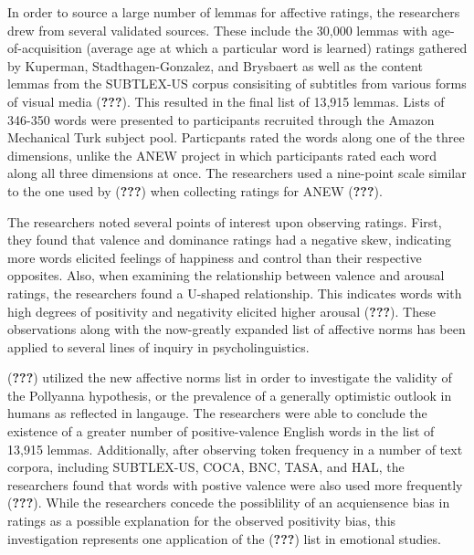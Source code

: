 \documentclass[,man]{apa6}
\theoremstyle{definition}
\theoremstyle{definition}
\theoremstyle{definition}
\theoremstyle{remark}
\begin{document}
In order to source a large number of lemmas for affective ratings, the
researchers drew from several validated sources. These include the
30,000 lemmas with age-of-acquisition (average age at which a particular
word is learned) ratings gathered by Kuperman, Stadthagen-Gonzalez, and
Brysbaert as well as the content lemmas from the SUBTLEX-US corpus
consisiting of subtitles from various forms of visual media
({\textbf{???}}). This resulted in the final list of 13,915 lemmas.
Lists of 346-350 words were presented to participants recruited through
the Amazon Mechanical Turk subject pool. Particpants rated the words
along one of the three dimensions, unlike the ANEW project in which
participants rated each word along all three dimensions at once. The
researchers used a nine-point scale similar to the one used by
({\textbf{???}}) when collecting ratings for ANEW ({\textbf{???}}).

The researchers noted several points of interest upon observing ratings.
First, they found that valence and dominance ratings had a negative
skew, indicating more words elicited feelings of happiness and control
than their respective opposites. Also, when examining the relationship
between valence and arousal ratings, the researchers found a U-shaped
relationship. This indicates words with high degrees of positivity and
negativity elicited higher arousal ({\textbf{???}}). These observations
along with the now-greatly expanded list of affective norms has been
applied to several lines of inquiry in psycholinguistics.

({\textbf{???}}) utilized the new affective norms list in order to
investigate the validity of the Pollyanna hypothesis, or the prevalence
of a generally optimistic outlook in humans as reflected in langauge.
The researchers were able to conclude the existence of a greater number
of positive-valence English words in the list of 13,915 lemmas.
Additionally, after observing token frequency in a number of text
corpora, including SUBTLEX-US, COCA, BNC, TASA, and HAL, the researchers
found that words with postive valence were also used more frequently
({\textbf{???}}). While the researchers concede the possiblility of an
acquiensence bias in ratings as a possible explanation for the observed
positivity bias, this investigation represents one application of the
({\textbf{???}}) list in emotional studies.
\end{document}
